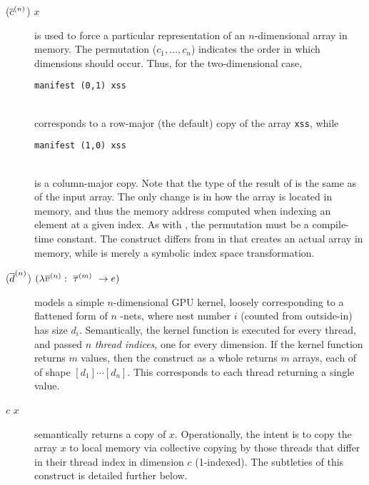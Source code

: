 \begin{description}
\item[ ($\nseq{c}{n}$) $x$] is used to force a particular
  representation of an $n$-dimensional array in memory.  The
  permutation ($c_{1}, \ldots, c_{n}$) indicates the order in
  which dimensions should occur.  Thus, for the two-dimensional case,\\
  \centerline{\mbox{\lstinline{manifest (0,1) xss}}}\\
  corresponds to a row-major
  (the default) copy of the array \lstinline{xss}, while\\
  \centerline{\mbox{\lstinline{manifest (1,0) xss}}}\\
  is a column-major copy.  Note that the type of the result of
   is the same as of the input array.  The only change is
  in how the array is located in memory, and thus the memory address
  computed when indexing an element at a given index.  As with
  , the permutation must be a compile-time constant.
  The  construct differs from  in that
   creates an actual array in memory, while
   is merely a symbolic index space transformation.
\item[ ($\nseq{d}{n}$)
  $(\Fn{\nseq{\tau}{m}}{\nseq{v}{n}}{e})$] models a simple
  $n$-dimensional GPU kernel, loosely corresponding to a flattened
  form of $n$ -nets, where nest number $i$ (counted from
  outside-in) has size $d_{i}$.  Semantically, the kernel function is
  executed for every thread, and passed $n$ \textit{thread indices},
  one for every dimension.  If the kernel function returns $m$ values,
  then the  construct as a whole returns $m$ arrays, each
  of of shape $[d_{1}]\cdots[d_{n}]$.  This corresponds to each thread
  returning a single value.
\item[ $c$ $x$] semantically returns a copy of $x$.
  Operationally, the intent is to copy the array $x$ to local memory
  via collective copying by those threads that differ in their thread
  index in dimension $c$ (1-indexed).  The subtleties of this
  construct is detailed further below.
\end{description}

